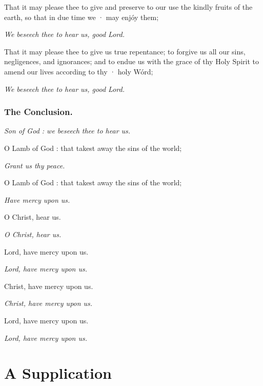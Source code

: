 That it may please thee to give and preserve to our use the kindly fruits of the earth, so that in due time we · may enjóy them;

\centerline{\emph{We beseech thee to hear us, good Lord.}}

That it may please thee to give us true repentance; to forgive us all our sins, negligences, and ignorances; and to endue us with the grace of thy Holy Spirit to amend our lives according to thy · holy Wórd;

\centerline{\emph{We beseech thee to hear us, good Lord.}}


\subsubsection{The Conclusion.}


\centerline{\emph{Son of God : we beseech thee to hear us.}}

O Lamb of God : that takest away the sins of the world;

\centerline{\emph{Grant us thy peace.}}

O Lamb of God : that takest away the sins of the world;

\centerline{\emph{Have mercy upon us.}}

\centerline{O Christ, hear us.}
\centerline{\emph{O Christ, hear us.}}

\centerline{Lord, have mercy upon us.}
\centerline{\emph{Lord, have mercy upon us.}}
\centerline{Christ, have mercy upon us.}
\centerline{\emph{Christ, have mercy upon us.}}
\centerline{Lord, have mercy upon us.}
\centerline{\emph{Lord, have mercy upon us.}}


\noindent
{}



\section{A Supplication}

